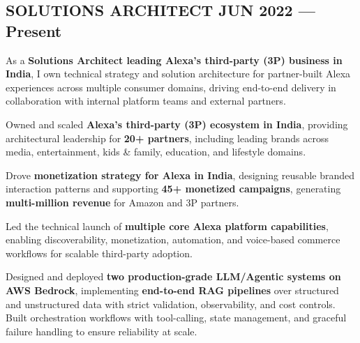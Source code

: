 \subsection{SOLUTIONS ARCHITECT \hfill \color{highlight} JUN 2022 --- Present}
\vspace{0.6em}
As a \textbf{Solutions Architect leading Alexa's third-party (3P) business in India}, I own technical strategy and solution architecture for partner-built Alexa experiences across multiple consumer domains, driving end-to-end delivery in collaboration with internal platform teams and external partners.
\begin{zitemize}
    \item Owned and scaled \textbf{Alexa's third-party (3P) ecosystem in India}, providing architectural leadership for \textbf{20+ partners}, including leading brands across media, entertainment, kids \& family, education, and lifestyle domains.
    \item Drove \textbf{monetization strategy for Alexa in India}, designing reusable branded interaction patterns and supporting \textbf{45+ monetized campaigns}, generating \textbf{multi-million revenue} for Amazon and 3P partners.
    \item Led the technical launch of \textbf{multiple core Alexa platform capabilities}, enabling discoverability, monetization, automation, and voice-based commerce workflows for scalable third-party adoption.
    \item Designed and deployed \textbf{two production-grade LLM/Agentic systems on AWS Bedrock}, implementing \textbf{end-to-end RAG pipelines} over structured and unstructured data with strict validation, observability, and cost controls. Built orchestration workflows with tool-calling, state management, and graceful failure handling to ensure reliability at scale.
\end{zitemize}
\vspace{0.3em}

